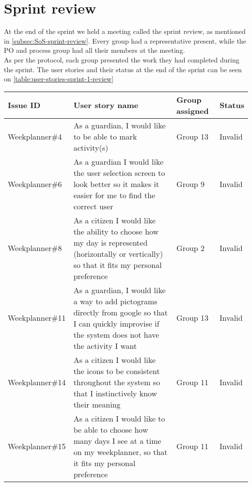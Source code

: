 \section{Sprint review}
At the end of the sprint we held a meeting called the sprint review, as mentioned in \autoref{subsec:SoS-sprint-review}.
Every group had a representative present, while the PO  and process group had all their members at the meeting.
\\
As per the protocol, each group presented the work they had completed during the sprint. The user stories and their status at the end of the sprint can be seen on \autoref{table:user-stories-sprint-1-review}

\begin{table}[H]
    \begin{tabular}{|p{2.8cm}|p{7cm}|p{2cm}|p{1.5cm}|}
    \hline
    Issue ID        & User story name                                                                                                                                                          & Group assigned  & Status     \\ \hline
    Weekplanner\#4  & As a guardian, I would like to be able to mark activity(s)                                                                                                               & Group 13        & Invalid    \\ \hline
    Weekplanner\#6  & As a guardian I would like the user selection screen to look better so it makes it easier for me to find the correct user                                                & Group 9         & Invalid    \\ \hline
    Weekplanner\#8  & As a citizen I would like the ability to choose how my day is represented (horizontally or vertically) so that it fits my personal preference                            & Group 2         & Invalid    \\ \hline
    Weekplanner\#11 & As a guardian, I would like a way to add pictograms directly from google so that I can quickly improvise if the system does not have the activity I want                 & Group 13        & Invalid    \\ \hline
    Weekplanner\#14 & As a citizen I would like the icons to be consistent throughout the system so that I instinctively know their meaning                                                    & Group 11        & Invalid    \\ \hline
    Weekplanner\#15 & As a citizen I would like to be able to choose how many days I see at a time on my weekplanner, so that it fits my personal preference                                   & Group 11        & Invalid    \\ \hline

\end{tabular}
\end{table}
